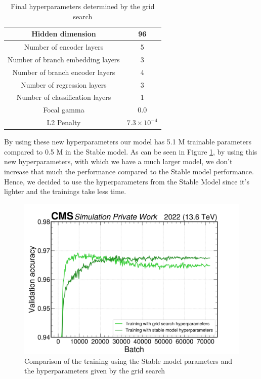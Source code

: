 \begin{table}[hbt]
\centering
\begin{tabular}{|c|c|}
 \hline
 Hidden dimension  &  96  \\
 \hline
Number of encoder layers & 5 \\
 \hline
 Number of branch embedding layers &  3\\
 \hline
  Number of branch encoder layers & 4\\
 \hline
 Number of regression layers & 3 \\
 \hline
 Number of classification layers & 1 \\
 \hline
 Focal gamma & 0.0 \\
 \hline
 L2 Penalty & $7.3\times 10^{-4}$ \\
 \hline
\end{tabular}
\caption{Final hyperparameters determined by the grid search}
\label{table: grid search}
\end{table}

By using these new hyperparameters our model has 5.1 M trainable parameters compared to 0.5 M in the Stable model. 
As can be seen in Figure \ref{fig: comp grid search}, by using this new hyperparameters, with which we have a much larger model, 
we don't increase that much the performance compared to the Stable model performance. 
Hence, we decided to use the hyperparameters from the Stable Model since it's lighter and the trainings take less time.

\begin{figure}[hbt]
    \centering
    \includegraphics[width=0.6\linewidth]{Images/6.Improving/Grid search/grid search.png}
    \caption{Comparison of the training using the Stable model parameters and the hyperparameters given by the grid search}
    \label{fig: comp grid search}
\end{figure}


\newpage

